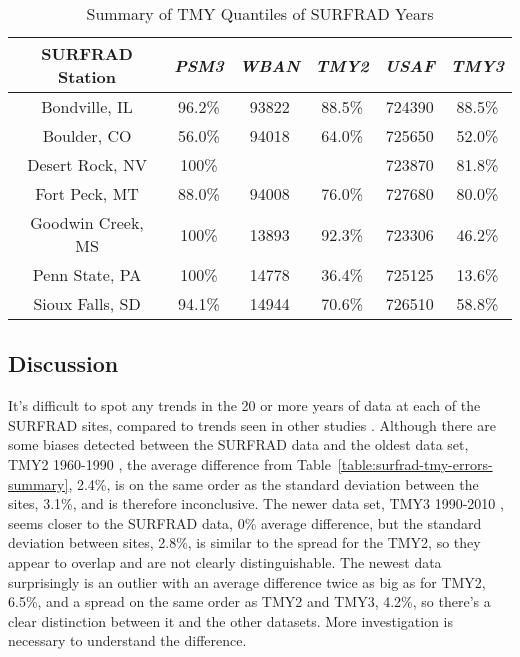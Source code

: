\documentclass[conference]{IEEEtran}
\begin{document}
\begin{table}[htbp]
\caption{Summary of TMY Quantiles of SURFRAD Years}
\begin{center}
\begin{tabular}{|c|c|c|c|c|c|}
\hline
\textbf{SURFRAD Station} & \textbf{\textit{PSM3}}& \textbf{\textit{WBAN}}& \textbf{\textit{TMY2}}& \textbf{\textit{USAF}}& \textbf{\textit{TMY3}} \\
\hline
Bondville, IL    & 96.2\%& 93822&  88.5\%&724390&  88.5\% \\
Boulder, CO      & 56.0\%& 94018&  64.0\%&725650&  52.0\% \\
Desert Rock, NV  & 100\% &      &        &723870&  81.8\% \\
Fort Peck, MT    & 88.0\%& 94008&  76.0\%&727680&  80.0\% \\
Goodwin Creek, MS& 100\% & 13893&  92.3\%&723306&  46.2\% \\
Penn State, PA   & 100\% & 14778&  36.4\%&725125&  13.6\% \\
Sioux Falls, SD  & 94.1\%& 14944&  70.6\%&726510&  58.8\% \\
\hline
\end{tabular}
\label{table:surfrad-tmy-quantile-summary}
\end{center}
\end{table}

\subsection{Discussion}
It's difficult to spot any trends in the 20 or more years of data at each of the SURFRAD sites, compared to trends seen in other studies \cite{Muller2014}. Although there are some biases detected between the SURFRAD data and the oldest data set, TMY2 1960-1990 \cite{Marion1995}, the average difference from Table~\ref{table:surfrad-tmy-errors-summary}, 2.4\%, is on the same order as the standard deviation between the sites, 3.1\%, and is therefore inconclusive. The newer data set, TMY3 1990-2010 \cite{Wilcox2012}, seems closer to the SURFRAD data, 0\% average difference, but the standard deviation between sites, 2.8\%, is similar to the spread for the TMY2, so they appear to overlap and are not clearly distinguishable. The newest data surprisingly is an outlier with an average difference twice as big as for TMY2, 6.5\%, and a spread on the same order as TMY2 and TMY3, 4.2\%, so there's a clear distinction between it and the other datasets. More investigation is necessary to understand the difference.
\end{document}
